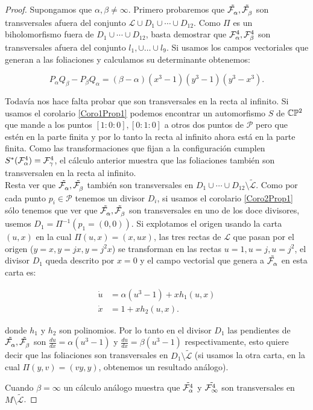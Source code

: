\begin{proof}
Supongamos que $\alpha , \beta\neq\infty$. Primero probaremos que $\tilde{\Fol{\alpha}},\tilde{\Fol{\beta}}$ son transversales afuera del conjunto $\mathcal{L}\cup D_{1}\cup\cdots\cup D_{12}$. Como $\Pi$ es un biholomorfismo fuera de $D_{1}\cup\cdots\cup D_{12}$, basta demostrar que $\Fol[4]{\alpha},\Fol[4]{\beta}$ son transversales afuera del conjunto $l_{1},\cup\ldots\cup l_{9}$. Si usamos los campos vectoriales que generan a las foliaciones y calculamos su determinante obtenemos:

\begin{equation*}
P_{\alpha}Q_{\beta}-P_{\beta}Q_{\alpha}=(\beta - \alpha)(x^{3}-1)(y^{3}-1)(y^{3}-x^{3}).
\end{equation*}

Todavía nos hace falta probar que son transversales en la recta al infinito. Si usamos el corolario \ref{Coro1Prop1} podemos encontrar un automorfismo $S$ de $\CP$ que mande a los puntos $[1:0:0],[0:1:0]$ a otros dos puntos de $\mathcal{P}$ pero que estén en la parte finita y por lo tanto la recta al infinito ahora está en la parte finita. Como las transformaciones que fijan a la configuración cumplen $S^{*}(\Fol[4]{\alpha})=\Fol[4]{\gamma}$, el cálculo anterior muestra que las foliaciones también son transversalen en la recta al infinito.\\

Resta ver que $\tilde{\Fol{\alpha}},\tilde{\Fol{\beta}}$ también son transversales en $D_{1}\cup\cdots\cup D_{12}\setminus\tilde{\mathcal{L}}$. Como por cada punto $p_{i}\in\mathcal{P}$ tenemos un divisor $D_{i}$, si usamos el corolario \ref{Coro2Prop1} sólo tenemos que ver que $\tilde{\Fol{\alpha}},\tilde{\Fol{\beta}}$ son transversales en uno de los doce divisores, usemos  $D_{1}=\Pi^{-1}(p_{1}=(0,0))$. Si explotamos el origen usando la carta $(u,x)$ en la cual  $\Pi(u,x)=(x,ux)$, las tres rectas de $\mathcal{L}$ que pasan por el origen ($y=x,y=jx,y=j^{2}x$) se transforman en las rectas $u=1,u=j,u=j^{2}$, el divisor $D_{1}$ queda descrito por $x=0$ y el campo vectorial que genera a $\tilde{\Fol{\alpha}}$ en esta carta es:

\begin{align*}
\dot{u}&= \alpha(u^{3}-1) + xh_{1}(u,x)\\
\dot{x}&= 1 + xh_{2}(u,x).
\end{align*}  

\noindent donde $h_{1}$ y $h_{2}$ son polinomios. Por lo tanto en el divisor $D_{1}$ las pendientes de $\tilde{\Fol{\alpha}},\tilde{\Fol{\beta}}$ son $\tfrac{du}{dx}=\alpha(u^{3}-1)$ y $\tfrac{du}{dx}=\beta(u^{3}-1)$ respectivamente, esto quiere decir que las foliaciones son transversales en $D_{1}\setminus\tilde{\mathcal{L}}$ (si usamos la otra carta, en la cual $\Pi(y,v)=(vy,y)$, obtenemos un resultado análogo).

\noindent Cuando $\beta=\infty$ un cálculo análogo muestra que $\tilde{\Foli_{\alpha}^{4}}$ y $\tilde{\Foli_{\infty}^{4}}$ son transversales en $M\setminus\tilde{\mathcal{L}}$. 
\end{proof}



